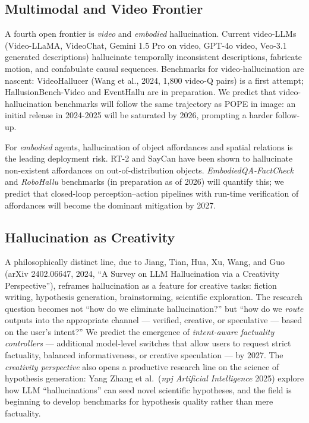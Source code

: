 \subsection{Multimodal and Video Frontier}\label{multimodal-and-video-frontier}

A fourth open frontier is \emph{video} and \emph{embodied} hallucination. Current video-LLMs (Video-LLaMA, VideoChat, Gemini 1.5 Pro on video, GPT-4o video, Veo-3.1 generated descriptions) hallucinate temporally inconsistent descriptions, fabricate motion, and confabulate causal sequences. Benchmarks for video-hallucination are nascent: VideoHallucer (Wang et al., 2024, 1,800 video-Q pairs) is a first attempt; HallusionBench-Video and EventHallu are in preparation. We predict that video-hallucination benchmarks will follow the same trajectory as POPE in image: an initial release in 2024-2025 will be saturated by 2026, prompting a harder follow-up.

For \emph{embodied} agents, hallucination of object affordances and spatial relations is the leading deployment risk. RT-2 and SayCan have been shown to hallucinate non-existent affordances on out-of-distribution objects. \emph{EmbodiedQA-FactCheck} and \emph{RoboHallu} benchmarks (in preparation as of 2026) will quantify this; we predict that closed-loop perception--action pipelines with run-time verification of affordances will become the dominant mitigation by 2027.

\subsection{Hallucination as Creativity}\label{hallucination-as-creativity}

A philosophically distinct line, due to Jiang, Tian, Hua, Xu, Wang, and Guo (arXiv 2402.06647, 2024, ``A Survey on LLM Hallucination via a Creativity Perspective''), reframes hallucination as a feature for creative tasks: fiction writing, hypothesis generation, brainstorming, scientific exploration. The research question becomes not ``how do we eliminate hallucination?'' but ``how do we \emph{route} outputs into the appropriate channel --- verified, creative, or speculative --- based on the user's intent?'' We predict the emergence of \emph{intent-aware factuality controllers} --- additional model-level switches that allow users to request strict factuality, balanced informativeness, or creative speculation --- by 2027. The \emph{creativity perspective} also opens a productive research line on the science of hypothesis generation: Yang Zhang et al.~(\emph{npj Artificial Intelligence} 2025) explore how LLM ``hallucinations'' can seed novel scientific hypotheses, and the field is beginning to develop benchmarks for hypothesis quality rather than mere factuality.

